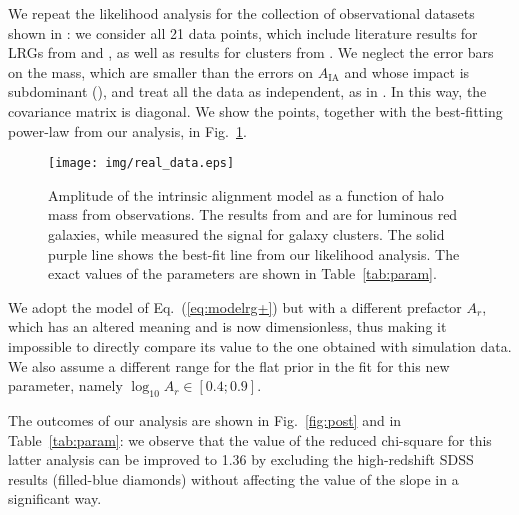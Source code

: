 \documentclass[a4paper,fleqn,usenatbib]{mnras}
\begin{document}
We repeat the likelihood analysis for the collection of observational datasets shown in \citet[figure 7]{vanUitertJoachimi2017}: we consider all 21 data points, which include literature results for LRGs from \citet{Singhetal2015} and \citet{Joachimietal2011}, as well as results for clusters from \citeauthor{vanUitertJoachimi2017}. We neglect the error bars on the mass, which are smaller than the errors on $A_{\mathrm{IA}}$ and whose impact is subdominant (\citeauthor{vanUitertJoachimi2017}), and treat all the data as independent, as in \citeauthor{vanUitertJoachimi2017}.
In this way, the covariance matrix is diagonal. We show the points, together with the best-fitting power-law from our analysis, in Fig.~\ref{fig:realdata}.
\begin{figure}
	\centerline{	
	\texttt{[image: img/real\_data.eps]}}
	\caption{Amplitude of the intrinsic alignment model as a function of halo mass from observations. The results from \citet{Joachimietal2011} and \citet{Singhetal2015} are for luminous red galaxies, while \citet{vanUitertJoachimi2017} measured the signal for galaxy clusters. The solid purple line shows the best-fit line from our likelihood analysis. The exact values of the parameters are shown in Table~\ref{tab:param}.}
	\label{fig:realdata}
\end{figure}

We adopt the model of Eq.~(\ref{eq:modelrg+}) but with a different prefactor $A_r$, which 
has an altered meaning and is now dimensionless, thus making it impossible to directly compare its value to the one obtained with simulation data. We also assume a different range for the flat prior in the fit for this new parameter, namely $\log_{10} A_r \in [0.4;0.9]$. 

The outcomes of our analysis are shown in Fig.~\ref{fig:post}\protect{} and in Table~\ref{tab:param}: we observe that the value of the reduced chi-square for this latter analysis can be improved to 1.36 by excluding the high-redshift SDSS results (filled-blue diamonds) without affecting the value of the slope in a significant way.
\end{document}
